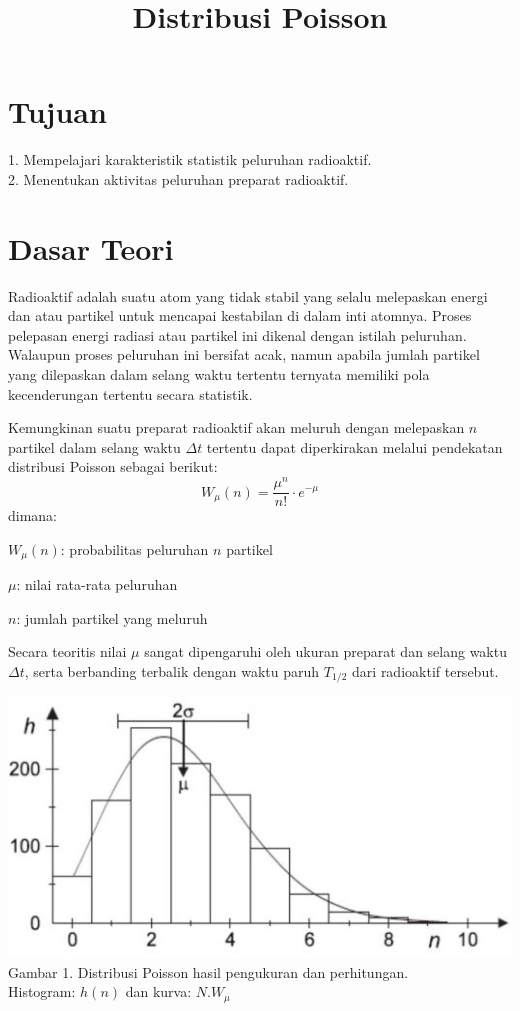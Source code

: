 \documentclass{article}
\title{Distribusi Poisson}
\date{}
\author{}
\begin{document}
	\maketitle
	
	\section*{Tujuan}
		1. Mempelajari karakteristik statistik peluruhan radioaktif.\\
		2. Menentukan aktivitas peluruhan preparat radioaktif.
	
	\section*{Dasar Teori}
	 
		\hspace{0.35 cm} Radioaktif adalah suatu atom yang tidak stabil yang selalu melepaskan energi dan atau partikel untuk mencapai kestabilan di dalam inti atomnya. Proses pelepasan energi radiasi atau partikel ini dikenal dengan istilah peluruhan. Walaupun proses peluruhan ini bersifat acak, namun apabila jumlah partikel yang dilepaskan dalam selang waktu tertentu ternyata memiliki pola kecenderungan tertentu secara statistik.\par
		Kemungkinan suatu preparat radioaktif akan meluruh dengan melepaskan $n$ partikel dalam selang waktu $\Delta t$ tertentu dapat diperkirakan melalui pendekatan distribusi Poisson
		sebagai berikut: 
		\begin{equation}
		W_{\mu}(n) = \frac{\mu^n}{n!}\cdot e^{-\mu}
		\end{equation}
		dimana:
		\par $W_{\mu}(n)$: probabilitas peluruhan $n$ partikel
		\par $\mu$: nilai rata-rata peluruhan
		\par $n$: jumlah partikel yang meluruh \\
		
		\par Secara teoritis nilai $\mu$ sangat dipengaruhi oleh ukuran preparat dan selang waktu $\Delta t$, serta berbanding terbalik dengan waktu paruh $T_{1/2}$ dari radioaktif tersebut. 
	
		
		
		\begin{center}
			\includegraphics{Picture/1.jpg}
			Gambar 1. Distribusi Poisson hasil pengukuran dan perhitungan. \\ Histogram: $h(n)$ dan kurva: $N.W_{\mu}$
		\end{center}
		
\end{document}
